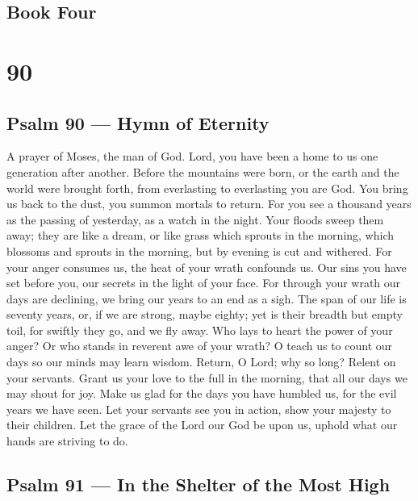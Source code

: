 \hypertarget{book-four}{%
\subsection{Book Four}\label{book-four}}

\hypertarget{section-89}{%
\section{90}\label{section-89}}

\hypertarget{psalm-90-hymn-of-eternity}{%
\subsection{Psalm 90 --- Hymn of
Eternity}\label{psalm-90-hymn-of-eternity}}

A prayer of Moses, the man of God.  Lord, you have been a
home to us one generation after another.  Before the
mountains were born, or the earth and the world were brought forth, from
everlasting to everlasting you are God.  You bring us back
to the dust, you summon mortals to return.  For you see a
thousand years as the passing of yesterday, as a watch in the night.
 Your floods sweep them away; they are like a dream, or like
grass which sprouts in the morning,  which blossoms and
sprouts in the morning, but by evening is cut and withered. 
For your anger consumes us, the heat of your wrath confounds us.
 Our sins you have set before you, our secrets in the light
of your face.  For through your wrath our days are
declining, we bring our years to an end as a sigh.  The
span of our life is seventy years, or, if we are strong, maybe eighty;
yet is their breadth but empty toil, for swiftly they go, and we fly
away.  Who lays to heart the power of your anger? Or who
stands in reverent awe of your wrath?  O teach us to count
our days so our minds may learn wisdom.  Return, O Lord;
why so long? Relent on your servants.  Grant us your love
to the full in the morning, that all our days we may shout for joy.
 Make us glad for the days you have humbled us, for the
evil years we have seen.  Let your servants see you in
action, show your majesty to their children.  Let the grace
of the Lord our God be upon us, uphold what our hands are striving to
do.

\hypertarget{psalm-91-in-the-shelter-of-the-most-high}{%
\subsection{Psalm 91 --- In the Shelter of the Most
High}\label{psalm-91-in-the-shelter-of-the-most-high}}

